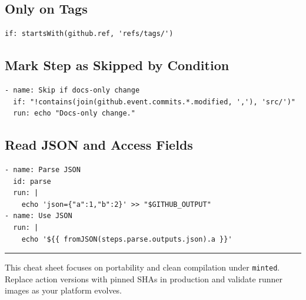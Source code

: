 \documentclass[11pt]{article}
\begin{document}
\subsection{Only on Tags}
\begin{verbatim}
if: startsWith(github.ref, 'refs/tags/')
\end{verbatim}

\subsection{Mark Step as Skipped by Condition}
\begin{verbatim}
- name: Skip if docs-only change
  if: "!contains(join(github.event.commits.*.modified, ','), 'src/')"
  run: echo "Docs-only change."
\end{verbatim}

\subsection{Read JSON and Access Fields}
\begin{verbatim}
- name: Parse JSON
  id: parse
  run: |
    echo 'json={"a":1,"b":2}' >> "$GITHUB_OUTPUT"
- name: Use JSON
  run: |
    echo '${{ fromJSON(steps.parse.outputs.json).a }}'
\end{verbatim}

\bigskip
\noindent\rule{\linewidth}{0.4pt}\par
\small This cheat sheet focuses on portability and clean compilation under \texttt{minted}. Replace action versions with pinned SHAs in production and validate runner images as your platform evolves.
\end{document}
